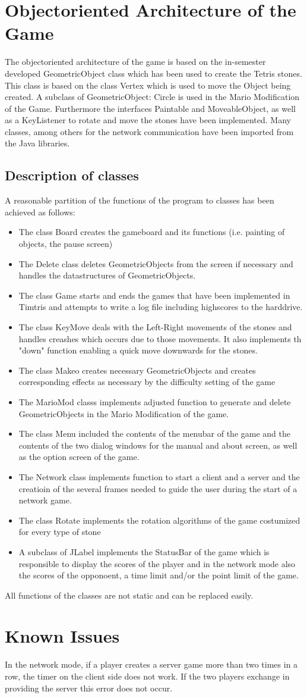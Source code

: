 \documentclass[10pt,a4paper,titlepage]{article}
\begin{document}
	\section{Objectoriented Architecture of the Game}
	The objectoriented architecture of the game is based on the in-semester developed GeometricObject class which has been used to create the Tetris stones. This class is based on the class Vertex which is used to move the Object being created. A subclass of GeometricObject: Circle is used in the Mario Modification of the Game. Furthermore the interfaces Paintable and MoveableObject, as well as a KeyListener to rotate and move the stones have been implemented. 
    Many classes, among others for the network communication have been imported from the Java libraries.
	\subsection{Description of classes}
	A reasonable partition of the functions of the program to classes has been achieved as follows:
	\begin{itemize}
		\item The class Board creates the gameboard and its functions (i.e. painting of objects, the pause screen)
		\item The Delete class deletes GeometricObjects from the screen if necessary and handles the datastructures of GeometricObjects.
		\item The class Game starts and ends the games that have been implemented in Timtris and attempts to write a log file including highscores to the harddrive.
		\item The class KeyMove deals with the Left-Right movements of the stones and handles creashes which occurs due to those movements. It also implements th "down" function enabling a quick move downwards for the stones.
		\item The class Makeo creates necessary GeometricObjects and creates corresponding effects as necessary by the difficulty setting of the game
		\item The MarioMod classs implements adjusted function to generate and delete GeometricObjects in the Mario Modification of the game.
		\item The class Menu included the contents of the menubar of the game and the contents of the two dialog windows for the manual and about screen, as well as the option screen of the game.
		\item The Network class implements function to start a client and a server and the creatioin of the several frames needed to guide the user during the start of a network game.
		\item The class Rotate implements the rotation algorithms of the game costumized for every type of stone
		\item A subclass of JLabel implements the StatusBar of the game which is responsible to display the scores of the player and in the network mode also the scores of the opponoent, a time limit and/or the point limit of the game.
	\end{itemize}
	All functions of the classes are not static and can be replaced easily.
	\section{Known Issues}
	In the network mode, if a player creates a server game more than two times in a row, the timer on the client side does not work. If the two players exchange in providing the server this error does not occur.
	
\end{document}
